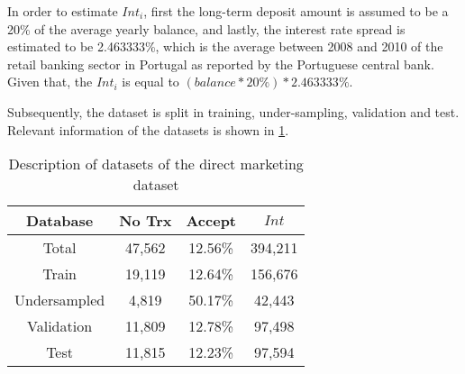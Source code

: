 	  In order to estimate $Int_i$, first the long-term deposit amount is assumed to be a 20\% of 
		the average yearly balance, and lastly, the interest rate spread is estimated to be 2.463333\%,
		which is the average between 2008 and 2010 of the retail banking sector in Portugal as reported 
		by the Portuguese central bank. Given that, the $Int_i$ is equal to $\left( balance * 20\% 
		\right) * 2.463333\%$.
		
  Subsequently, the dataset is split in training, under-sampling, validation and test. Relevant 
information of the datasets is shown
  in \tablename{ \ref{table_fraud_trainandtest_marketing}}.
 
	\begin{table}[!t]
	\caption{Description of datasets of the direct marketing dataset}
	\label{table_fraud_trainandtest_marketing}
	\centering
	\begin{tabular}{|c|c|c|c|} %
		\hline
		Database&	No Trx&	Accept&$Int$\\
		\hline	
		Total& 47,562&	12.56\%&	394,211\\
		\hline
		Train& 19,119&12.64\%&	156,676\\   
		Undersampled&4,819&50.17\%&42,443   \\
		\hline
		Validation& 11,809&12.78\%&97,498   \\
		Test& 11,815&12.23\%&97,594   \\
		\hline
	\end{tabular}
	\end{table}
	
